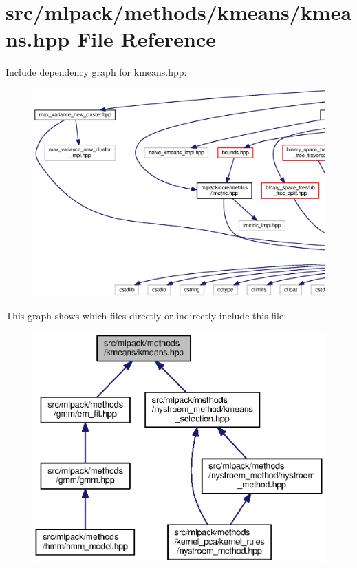 \section{src/mlpack/methods/kmeans/kmeans.hpp File Reference}
\label{kmeans_8hpp}
Include dependency graph for kmeans.\+hpp\+:
\nopagebreak
\begin{figure}[H]
\begin{center}
\leavevmode
\includegraphics[width=350pt]{kmeans_8hpp__incl}
\end{center}
\end{figure}
This graph shows which files directly or indirectly include this file\+:
\nopagebreak
\begin{figure}[H]
\begin{center}
\leavevmode
\includegraphics[width=350pt]{kmeans_8hpp__dep__incl}
\end{center}
\end{figure}
